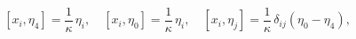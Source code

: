 \begin{equation}\label{26}
  [x_i, \eta_4] =\frac{1}\kappa\, \eta_i, \quad [x_i, \eta_0] =\frac{1}\kappa\, \eta_i, \quad
  [x_i, \eta_j] = \frac{1}\kappa\,
\delta_{ij}(\eta_0 - \eta_4),
\end{equation}

